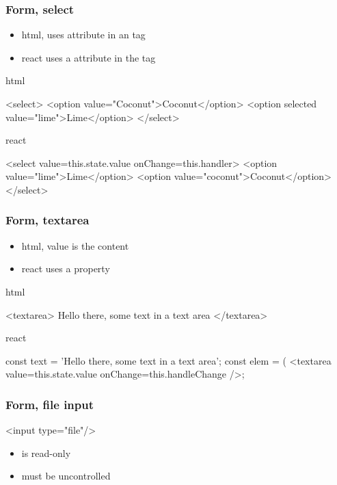 \begin{frame}[fragile] \frametitle{Form, select}
\begin{itemize}
  \item html, uses  attribute in an  tag
  \item react uses a  attribute in the  tag
\end{itemize}
\vspace{3mm}
html
\begin{CodeBox}{}
<select>
  <option value="Coconut">Coconut</option>
  <option selected value="lime">Lime</option>
</select>\end{CodeBox}
\vspace{3mm}
react
\begin{CodeBox}{}
<select value={this.state.value} onChange={this.handler}>
  <option value="lime">Lime</option>
  <option value="coconut">Coconut</option>
</select>\end{CodeBox}
\end{frame}

\begin{frame}[fragile] \frametitle{Form, textarea}
\begin{itemize}
  \item html, value is the content
  \item react uses a  property
\end{itemize}
\vspace{3mm}
html
\begin{CodeBox}{}
<textarea>
  Hello there, some text in a text area
</textarea>
\end{CodeBox}
\vspace{3mm}
react
\begin{CodeBox}{}
const text = 'Hello there, some text in a text area';
const elem = (
  <textarea value={this.state.value}
               onChange={this.handleChange} />;
\end{CodeBox}
\end{frame}

\begin{frame}[fragile] \frametitle{Form, file input}
\begin{CodeBox}{}
<input type="file"/>
\end{CodeBox}
\vspace{8mm}

\begin{itemize}
  \item is read-only
  \item must be uncontrolled
\end{itemize}
\end{frame}

